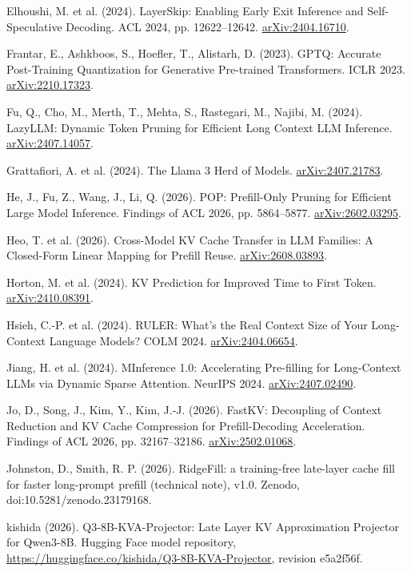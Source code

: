 \documentclass[11pt]{article}
\begin{document}
\begin{list}{}{\setlength{\leftmargin}{1.5em}\setlength{\itemindent}{-1.5em}\setlength{\itemsep}{1pt}\setlength{\parsep}{0pt}}
\item Elhoushi, M. et al. (2024). LayerSkip: Enabling Early Exit Inference and Self-Speculative Decoding. ACL 2024, pp. 12622--12642. \href{https://arxiv.org/abs/2404.16710}{arXiv:2404.16710}.
\item Frantar, E., Ashkboos, S., Hoefler, T., Alistarh, D. (2023). GPTQ: Accurate Post-Training Quantization for Generative Pre-trained Transformers. ICLR 2023. \href{https://arxiv.org/abs/2210.17323}{arXiv:2210.17323}.
\item Fu, Q., Cho, M., Merth, T., Mehta, S., Rastegari, M., Najibi, M. (2024). LazyLLM: Dynamic Token Pruning for Efficient Long Context LLM Inference. \href{https://arxiv.org/abs/2407.14057}{arXiv:2407.14057}.
\item Grattafiori, A. et al. (2024). The Llama 3 Herd of Models. \href{https://arxiv.org/abs/2407.21783}{arXiv:2407.21783}.
\item He, J., Fu, Z., Wang, J., Li, Q. (2026). POP: Prefill-Only Pruning for Efficient Large Model Inference. Findings of ACL 2026, pp. 5864--5877. \href{https://arxiv.org/abs/2602.03295}{arXiv:2602.03295}.
\item Heo, T. et al. (2026). Cross-Model KV Cache Transfer in LLM Families: A Closed-Form Linear Mapping for Prefill Reuse. \href{https://arxiv.org/abs/2608.03893}{arXiv:2608.03893}.
\item Horton, M. et al. (2024). KV Prediction for Improved Time to First Token. \href{https://arxiv.org/abs/2410.08391}{arXiv:2410.08391}.
\item Hsieh, C.-P. et al. (2024). RULER: What's the Real Context Size of Your Long-Context Language Models? COLM 2024. \href{https://arxiv.org/abs/2404.06654}{arXiv:2404.06654}.
\item Jiang, H. et al. (2024). MInference 1.0: Accelerating Pre-filling for Long-Context LLMs via Dynamic Sparse Attention. NeurIPS 2024. \href{https://arxiv.org/abs/2407.02490}{arXiv:2407.02490}.
\item Jo, D., Song, J., Kim, Y., Kim, J.-J. (2026). FastKV: Decoupling of Context Reduction and KV Cache Compression for Prefill-Decoding Acceleration. Findings of ACL 2026, pp. 32167--32186. \href{https://arxiv.org/abs/2502.01068}{arXiv:2502.01068}.
\item Johnston, D., Smith, R. P. (2026). RidgeFill: a training-free late-layer cache fill for faster long-prompt prefill (technical note), v1.0. Zenodo, doi:10.5281/zenodo.23179168.
\item kishida (2026). Q3-8B-KVA-Projector: Late Layer KV Approximation Projector for Qwen3-8B. Hugging Face model repository, \url{https://huggingface.co/kishida/Q3-8B-KVA-Projector}, revision e5a2f56f.

\end{list}
\end{document}
